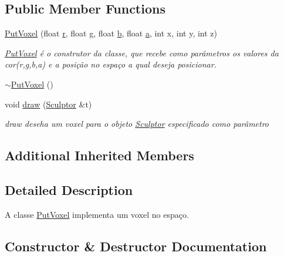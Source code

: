 \subsection*{Public Member Functions}
\begin{DoxyCompactItemize}
\item 
\hyperlink{class_put_voxel_aff93a249c1f4919758acd26f34384d05}{Put\+Voxel} (float \hyperlink{class_figura_geometrica_a0a4f57efb1a6c525c8aeee34c92e7eab}{r}, float \hyperlink{class_figura_geometrica_a51930549bcb90d016b824f10f95df355}{g}, float \hyperlink{class_figura_geometrica_a25e5d6c21410103c25ec55c0117dac0d}{b}, float \hyperlink{class_figura_geometrica_ae7c8a027fcec3c357265b90458a4d165}{a}, int x, int y, int z)
\begin{DoxyCompactList}\small\item\em \hyperlink{class_put_voxel}{Put\+Voxel} é o construtor da classe, que recebe como parâmetros os valores da cor(r,g,b,a) e a posição no espaço a qual deseja posicionar. \end{DoxyCompactList}\item 
\hyperlink{class_put_voxel_ac3c14b19e69b462e3178b5dca92d7b34}{$\sim$\+Put\+Voxel} ()
\item 
void \hyperlink{class_put_voxel_af784ab77d8a7aac2010e608796710ccb}{draw} (\hyperlink{class_sculptor}{Sculptor} \&t)
\begin{DoxyCompactList}\small\item\em draw deseha um voxel para o objeto \hyperlink{class_sculptor}{Sculptor} especificado como parâmetro \end{DoxyCompactList}\end{DoxyCompactItemize}
\subsection*{Additional Inherited Members}


\subsection{Detailed Description}
A classe \hyperlink{class_put_voxel}{Put\+Voxel} implementa um voxel no espaço. 

\subsection{Constructor \& Destructor Documentation}
\mbox{\label{class_put_voxel_aff93a249c1f4919758acd26f34384d05}} 

